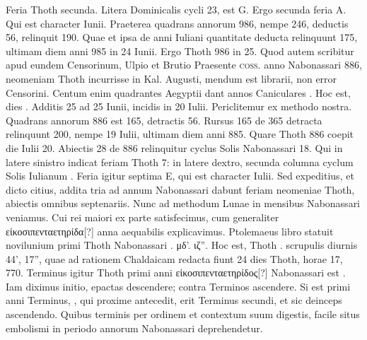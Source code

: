 Feria Thoth secunda.
Litera Dominicalis cycli
23, est \textsc{G}.
Ergo secunda feria \textsc{A}.
Qui est character  Iunii.
Praeterea
quadrans annorum 986, nempe 246, deductis 56, relinquit
190.
Quae et ipsa de anni Iuliani quantitate deducta relinquunt 175,
ultimam diem anni 985 in 24 Iunii.
Ergo Thoth 986 in 25.
Quod
autem scribitur apud eundem Censorinum, Ulpio et Brutio Praesente
\textsc{coss.} anno Nabonassari 886, neomeniam %
 Thoth incurrisse in  Kal.
Augusti, mendum est librarii, non error Censorini.
Centum enim quadrantes %
Aegyptii dant annos Caniculares . %
Hoc est, dies .
Additis
25 ad 25 Iunii, incidis in 20 Iulii.
Periclitemur ex methodo nostra.
Quadrans
annorum 886 est 165, detractis 56.
%
Rursus 165 de 365 detracta
relinquunt 200, nempe 19 Iulii, ultimam diem anni 885.
Quare
Thoth 886 coepit die Iulii 20.
Abiectis 28 de 886 relinquitur cyclus
Solis Nabonassari 18.
Qui in latere sinistro indicat feriam Thoth 7: in
latere dextro, secunda columna cyclum Solis Iulianum .
Feria igitur
septima \textsc{E}, qui est character  Iulii.
Sed expeditius, et dicto citius,
addita tria ad annum Nabonassari dabunt feriam neomeniae Thoth,
abiectis omnibus septenariis.
Nunc ad methodum Lunae in mensibus
Nabonassari veniamus.
Cui rei maiori ex parte satisfecimus,
cum generaliter \textgreek{εἰκοσιπενταετηρίδα}[?] anna aequabilis explicavimus.
Ptolemaeus
libro  statuit novilunium primi Thoth Nabonassari
 \textgreek{. μδ'. ιζ''}. %
Hoc est, Thoth . %
 scrupulis diurnis 44', 17'', quae ad
rationem Chaldaicam redacta fiunt 24 dies Thoth, horae 17, 770.
Terminus igitur Thoth primi anni \textgreek{εἰκοσιπενταετηρίδος}[?]
 Nabonassari est
.
Iam diximus initio, epactas descendere; contra Terminos ascendere.
Si  est primi anni Terminus, ,
 qui proxime antecedit,
erit Terminus secundi, et sic deinceps ascendendo.
Quibus
terminis per ordinem et contextum suum digestis, facile situs embolismi
in periodo annorum Nabonassari deprehendetur.
